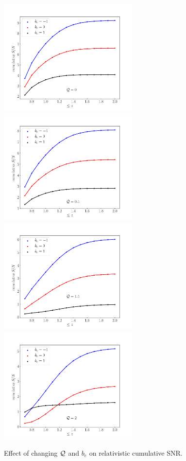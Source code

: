 \begin{figure}[ht]
\centering
\includegraphics[width=7cm]{fig/cumulativeSnrdopplerQ0_0-eps-converted-to} 
\includegraphics[width=7cm]{fig/cumulativeSnrdopplerQ0_5-eps-converted-to} \\
\includegraphics[width=7cm]{fig/cumulativeSnrdopplerQ1_5-eps-converted-to}
\includegraphics[width=7cm]{fig/cumulativeSnrdopplerQ2_0-eps-converted-to} 
\caption{Effect of changing ${\cal Q}$ and $b_e$ on relativistic cumulative SNR.} \label{fig1x}
\end{figure}



